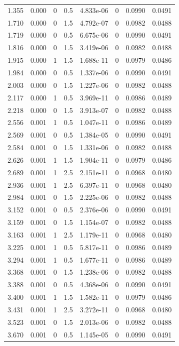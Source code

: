 \documentclass[preview]{standalone}
\begin{document}
{{\begin{tabular}{L{1.2cm}C{1.2cm} C{0.3cm}C{0.5cm} C{1.4cm}C{1.4cm} C{1.4cm}C{1.4cm}}
  1.355  &  0.000  & 0     & 0.5 &  4.833e-06  & 0  & 0.0990 &  0.0491   \\ 
  1.710  &  0.000  & 0     & 1.5 &  4.792e-07  & 0  & 0.0982 &  0.0488   \\ 
  1.719  &  0.000  & 0     & 0.5 &  6.675e-06  & 0  & 0.0990 &  0.0491   \\ 
  1.816  &  0.000  & 0     & 1.5 &  3.419e-06  & 0  & 0.0982 &  0.0488   \\ 
  1.915  &  0.000  & 1     & 1.5 &  1.688e-11  & 0  & 0.0979 &  0.0486   \\ 
  1.984  &  0.000  & 0     & 0.5 &  1.337e-06  & 0  & 0.0990 &  0.0491   \\ 
  2.003  &  0.000  & 0     & 1.5 &  1.227e-06  & 0  & 0.0982 &  0.0488   \\ 
  2.117  &  0.000  & 1     & 0.5 &  3.969e-11  & 0  & 0.0986 &  0.0489   \\ 
  2.218  &  0.000  & 0     & 1.5 &  3.913e-07  & 0  & 0.0982 &  0.0488   \\ 
  2.556  &  0.001  & 1     & 0.5 &  1.047e-11  & 0  & 0.0986 &  0.0489   \\ 
  2.569  &  0.001  & 0     & 0.5 &  1.384e-05  & 0  & 0.0990 &  0.0491   \\ 
  2.584  &  0.001  & 0     & 1.5 &  1.331e-06  & 0  & 0.0982 &  0.0488   \\ 
  2.626  &  0.001  & 1     & 1.5 &  1.904e-11  & 0  & 0.0979 &  0.0486   \\ 
  2.689  &  0.001  & 1     & 2.5 &  2.151e-11  & 0  & 0.0968 &  0.0480   \\ 
  2.936  &  0.001  & 1     & 2.5 &  6.397e-11  & 0  & 0.0968 &  0.0480   \\ 
  2.984  &  0.001  & 0     & 1.5 &  2.225e-06  & 0  & 0.0982 &  0.0488   \\ 
  3.152  &  0.001  & 0     & 0.5 &  2.376e-06  & 0  & 0.0990 &  0.0491   \\ 
  3.159  &  0.001  & 0     & 1.5 &  1.154e-07  & 0  & 0.0982 &  0.0488   \\ 
  3.163  &  0.001  & 1     & 2.5 &  1.179e-11  & 0  & 0.0968 &  0.0480   \\ 
  3.225  &  0.001  & 1     & 0.5 &  5.817e-11  & 0  & 0.0986 &  0.0489   \\ 
  3.294  &  0.001  & 1     & 0.5 &  1.677e-11  & 0  & 0.0986 &  0.0489   \\ 
  3.368  &  0.001  & 0     & 1.5 &  1.238e-06  & 0  & 0.0982 &  0.0488   \\ 
  3.388  &  0.001  & 0     & 0.5 &  4.368e-06  & 0  & 0.0990 &  0.0491   \\ 
  3.400  &  0.001  & 1     & 1.5 &  1.582e-11  & 0  & 0.0979 &  0.0486   \\ 
  3.431  &  0.001  & 1     & 2.5 &  3.272e-11  & 0  & 0.0968 &  0.0480   \\ 
  3.523  &  0.001  & 0     & 1.5 &  2.013e-06  & 0  & 0.0982 &  0.0488   \\ 
  3.670  &  0.001  & 0     & 0.5 &  1.145e-05  & 0  & 0.0990 &  0.0491   \\ 
\hline 
\end{tabular} 

}}
\end{document}
